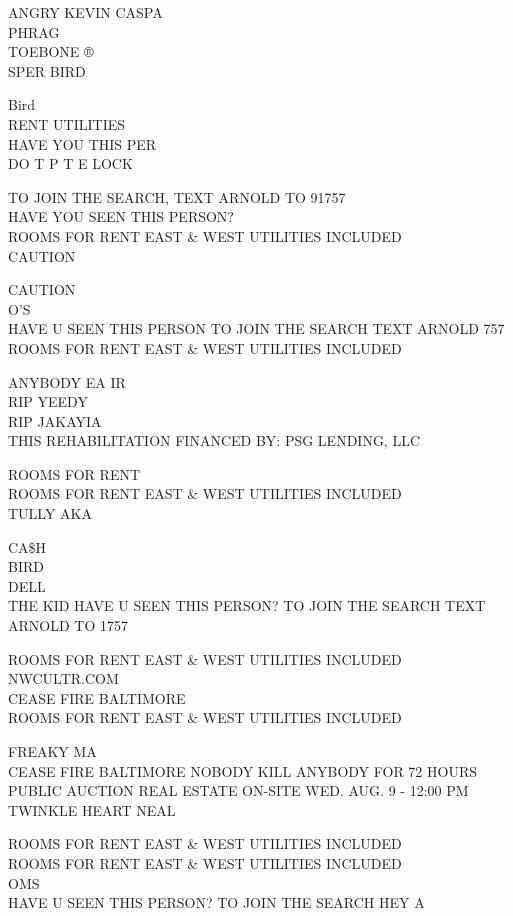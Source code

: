 \documentclass[10pt,letterpaper]{article}
\begin{document}
ANGRY KEVIN CASPA\\
PHRAG\\
TOEBONE ®\\
SPER BIRD

Bird\\
RENT UTILITIES\\
HAVE YOU THIS PER\\
DO T P T E LOCK

TO JOIN THE SEARCH, TEXT ARNOLD TO 91757\\
HAVE YOU SEEN THIS PERSON?\\
ROOMS FOR RENT EAST \& WEST UTILITIES INCLUDED\\
CAUTION

CAUTION\\
O'S\\
HAVE U SEEN THIS PERSON TO JOIN THE SEARCH TEXT ARNOLD 757\\
ROOMS FOR RENT EAST \& WEST UTILITIES INCLUDED

ANYBODY EA IR\\
RIP YEEDY\\
RIP JAKAYIA\\
THIS REHABILITATION FINANCED BY: PSG LENDING, LLC

ROOMS FOR RENT\\
ROOMS FOR RENT EAST \& WEST UTILITIES INCLUDED\\
TULLY AKA

CA\$H\\
BIRD\\
DELL\\
THE KID HAVE U SEEN THIS PERSON?  TO JOIN THE SEARCH TEXT ARNOLD TO 1757

ROOMS FOR RENT EAST \& WEST UTILITIES INCLUDED\\
NWCULTR.COM\\
CEASE FIRE BALTIMORE\\
ROOMS FOR RENT EAST \& WEST UTILITIES INCLUDED

FREAKY MA\\
CEASE FIRE BALTIMORE NOBODY KILL ANYBODY FOR 72 HOURS\\
PUBLIC AUCTION REAL ESTATE ON{-}SITE WED. AUG. 9 {-} 12:00 PM\\
TWINKLE HEART NEAL

ROOMS FOR RENT EAST \& WEST UTILITIES INCLUDED\\
ROOMS FOR RENT EAST \& WEST UTILITIES INCLUDED\\
OMS\\
HAVE U SEEN THIS PERSON?  TO JOIN THE SEARCH HEY A
\end{document}
